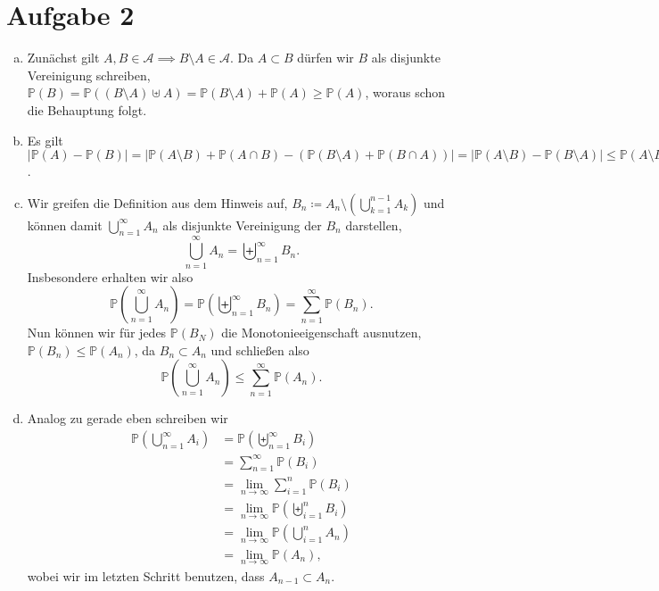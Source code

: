 \documentclass{article}
\newcommand{\A}{\mathcal{A}}
\newcommand{\IP}{\mathbb{P}}
\begin{document}
    \section*{Aufgabe 2}
    \begin{enumerate}[(a)]
        \item Zunächst gilt $A, B \in \A \implies B\setminus A \in \A$. Da $A \subset B$ dürfen wir $B$ als disjunkte Vereinigung schreiben, $\IP(B) = \IP((B\setminus A) \uplus A) = \IP(B\setminus A) + \IP(A) \geq \IP(A)$, woraus schon die Behauptung folgt.
        \item Es gilt $|\IP(A) - \IP(B)| = |\IP(A\setminus B) + \IP(A \cap B) - (\IP(B\setminus A) + \IP(B\cap A))| = |\IP(A\setminus B) - \IP(B\setminus A)| \leq \IP(A\setminus B) + \IP(B\setminus A) = \IP((A \setminus B) \cup (B\setminus A)) = \IP(A \triangle B)$.
        \item Wir greifen die Definition aus dem Hinweis auf, $B_n \coloneqq A_n \setminus \left(\bigcup_{k=1}^{n-1} A_k\right)$ und können damit $\bigcup_{n=1}^\infty A_n$ als disjunkte Vereinigung der $B_n$ darstellen,
        \[
            \bigcup_{n=1}^\infty A_n = \biguplus_{n = 1}^\infty B_n.
        \]
        Insbesondere erhalten wir also
        \[
            \IP\left(\bigcup_{n=1}^\infty A_n\right)  = \IP \left(\biguplus_{n = 1}^\infty B_n\right) = \sum_{n = 1}^{\infty} \IP(B_n).
        \]
        Nun können wir für jedes $\IP(B_N)$ die Monotonieeigenschaft ausnutzen, $\IP(B_n) \leq \IP(A_n)$, da $B_n \subset A_n$ und schließen also
        \[
            \IP\left(\bigcup_{n=1}^\infty A_n\right) \leq  \sum_{n = 1}^{\infty} \IP(A_n).
        \]
        \item Analog zu gerade eben schreiben wir
        \begin{align*}
            \IP\left(\bigcup_{n=1}^\infty A_i\right) &= \IP\left(\biguplus_{n=1}^\infty B_i\right)\\
            &= \sum_{n = 1}^{\infty} \IP(B_i)\\
            &= \lim\limits_{n \to \infty} \sum_{i = 1}^{n} \IP(B_i)\\
            &= \lim\limits_{n \to \infty} \IP\left(\biguplus_{i=1}^n B_i\right)\\
            &= \lim\limits_{n \to \infty} \IP(\bigcup_{i=1}^n A_n)\\
            &= \lim\limits_{n \to \infty} \IP(A_n),
        \end{align*}
        wobei wir im letzten Schritt benutzen, dass $A_{n-1}\subset A_n$.
    \end{enumerate}
\end{document}
